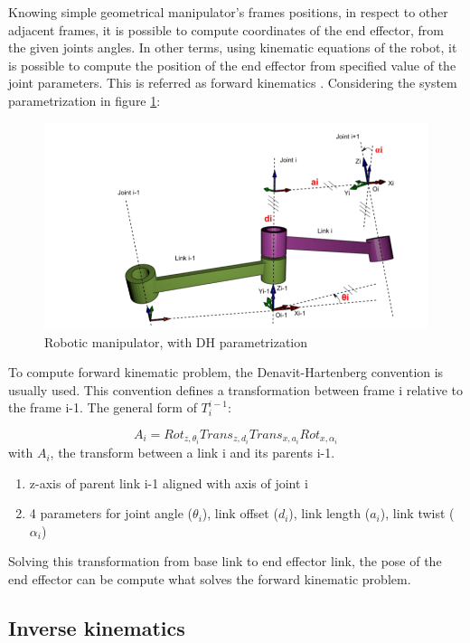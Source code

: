 Knowing simple geometrical manipulator’s frames positions, in respect to other adjacent frames, it is possible to compute coordinates of the end effector, from the given joints angles. In other terms, using kinematic equations of the robot, it is possible to compute the position of the end effector from specified value of the joint parameters. This is referred as forward kinematics \cite{trove.nla.gov.au/work/27361264}.
Considering the system parametrization in figure \ref{pict:dh}:

\begin{figure} [!ht]
    \centering
    \includegraphics[width=0.45\linewidth]{images/dh.png}
    \caption{Robotic manipulator, with DH parametrization}
    \label{pict:dh}
\end{figure}

To compute forward kinematic problem, the Denavit-Hartenberg convention is usually used. This convention defines a transformation between frame {i} relative to the frame {i-1}. The general form of $T_i^{i-1}$:

\begin{equation}
    A_i = Rot_{z,\theta _i} Trans_{z,d_i} Trans_{x,a_i} Rot_{x, \alpha _i}
\end{equation}
with $A_i$, the transform between a link i and its parents i-1.
\begin{enumerate}
    \item z-axis of parent link i-1 aligned with axis of joint i
    \item 4 parameters for joint angle ($\theta _i$), link offset ($d_i$), link length ($a_i$), link twist ($\alpha _i$)
\end{enumerate}
Solving this transformation from base link to end effector link, the pose of the end effector can be compute what solves the forward kinematic problem. 

\subsection{Inverse kinematics}
\label{chap:inversekinematics}


